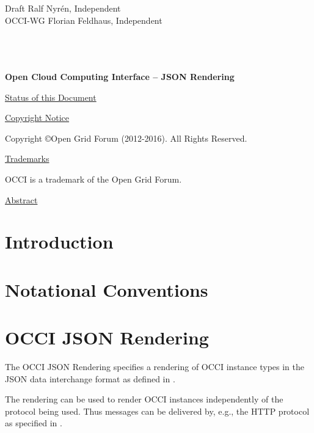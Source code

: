 \documentclass[10pt,a4paper]{article}
\begin{document}
\thispagestyle{empty}

Draft \hfill Ralf Nyrén, Independent \\
OCCI-WG \hfill Florian Feldhaus, Independent\\
\\
\\
\\

\vspace*{0.5in}

\begin{Large}
\textbf{Open Cloud Computing Interface -- JSON Rendering}
\end{Large}

\vspace*{0.5in}

\underline{Status of this Document}



\underline{Copyright Notice}

Copyright \copyright Open Grid Forum (2012-2016). All Rights Reserved.

\underline{Trademarks}

OCCI is a trademark of the Open Grid Forum.

\underline{Abstract}



\newpage
\tableofcontents
\newpage

\section{Introduction}


\section{Notational Conventions}


\section{OCCI JSON Rendering}
\label{sec:json_format}
The OCCI JSON Rendering specifies a rendering of OCCI instance types in the JSON
data interchange format as defined in \cite{rfc4627}.

The rendering can be used to render OCCI instances independently of the
protocol being used. Thus messages can be delivered by, e.g., the HTTP
protocol as specified in \cite{occi:http_protocol}.
\end{document}
